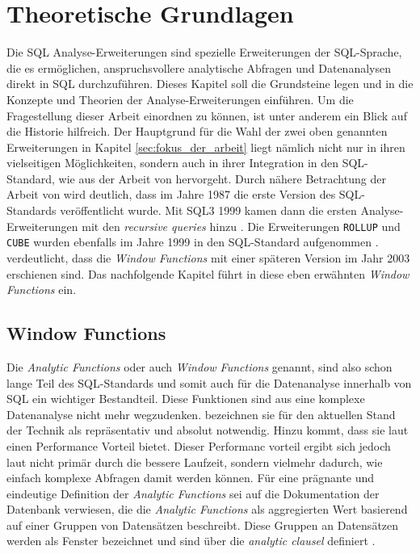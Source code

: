 \chapter{Theoretische Grundlagen}
\label{chap:hintergund_und_grundlagen} Die SQL Analyse-Erweiterungen sind spezielle
Erweiterungen der SQL-Sprache, die es ermöglichen, anspruchsvollere analytische Abfragen
und Datenanalysen direkt in SQL durchzuführen. Dieses Kapitel soll die
Grundsteine legen und in die Konzepte und Theorien der Analyse-Erweiterungen
einführen. Um die Fragestellung dieser Arbeit einordnen zu können, ist unter
anderem ein Blick auf die Historie hilfreich. Der Hauptgrund für die Wahl der zwei
oben genannten Erweiterungen in Kapitel \ref{sec:fokus_der_arbeit} liegt nämlich
nicht nur in ihren vielseitigen Möglichkeiten, sondern auch in ihrer Integration
in den SQL-Standard, wie aus der Arbeit von \citet[S.~10]{grust2017advanced}
hervorgeht. Durch nähere Betrachtung der Arbeit von \cite{grust2017advanced} wird
deutlich, dass im Jahre 1987 die erste Version des SQL-Standards veröffentlicht
wurde. Mit SQL3 1999 kamen dann die ersten Analyse-Erweiterungen mit den \textit{recursive
queries} hinzu \citep[vgl.][S.~10]{grust2017advanced}. Die Erweiterungen \texttt{ROLLUP}
und \texttt{CUBE} wurden ebenfalls im Jahre 1999 in den SQL-Standard aufgenommen
\citep[vgl.][Kapitel 9.12]{melton2001sql}. \citet[S.~10]{grust2017advanced}
verdeutlicht, dass die \textit{Window Functions} mit einer späteren Version im
Jahr 2003 erschienen sind. Das nachfolgende Kapitel führt in diese eben erwähnten
\textit{Window Functions} ein.

\section{Window Functions}
\label{sec:window_functions} Die \textit{Analytic Functions} oder auch \textit{Window
Functions} genannt, sind also schon lange Teil des SQL-Standards und somit auch für
die Datenanalyse innerhalb von SQL ein wichtiger Bestandteil. Diese Funktionen
sind aus eine komplexe Datenanalyse nicht mehr wegzudenken. \citet[Abstract]{cao2012optimization}
bezeichnen sie für den aktuellen Stand der Technik als repräsentativ und absolut
notwendig. Hinzu kommt, dass sie laut \citet[Kapitel 8]{kellenberger2019expert} einen
Performance Vorteil bietet. Dieser Performanc vorteil ergibt sich jedoch laut
\citet[Kapitel 8]{kellenberger2019expert} nicht primär durch die bessere
Laufzeit, sondern vielmehr dadurch, wie einfach komplexe Abfragen damit werden
können. Für eine prägnante und eindeutige Definition der \textit{Analytic
Functions} sei auf die Dokumentation der \citet{oracle} Datenbank verwiesen, die
die \textit{Analytic Functions} als aggregierten Wert basierend auf einer Gruppen
von Datensätzen beschreibt. Diese Gruppen an Datensätzen werden als Fenster
bezeichnet und sind über die \textit{analytic clausel} definiert \citep[vgl.][]{oracle}.

